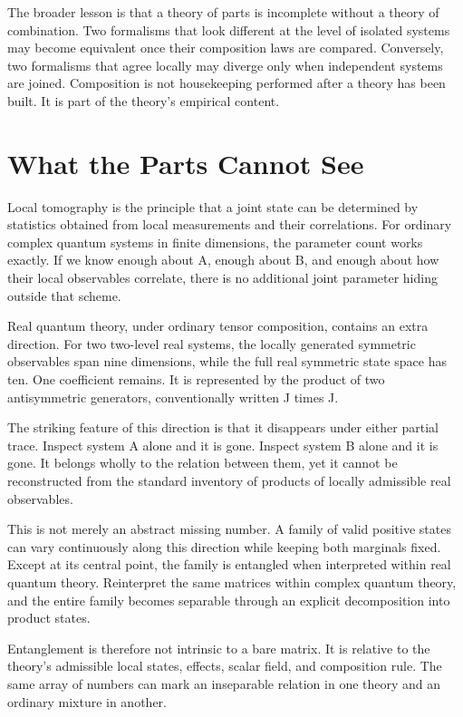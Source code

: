 \documentclass[12pt,openany]{book}
\begin{document}
The broader lesson is that a theory of parts is incomplete without a theory of combination. Two formalisms that look different at the level of isolated systems may become equivalent once their composition laws are compared. Conversely, two formalisms that agree locally may diverge only when independent systems are joined. Composition is not housekeeping performed after a theory has been built. It is part of the theory's empirical content.

\chapter{What the Parts Cannot See}
Local tomography is the principle that a joint state can be determined by statistics obtained from local measurements and their correlations. For ordinary complex quantum systems in finite dimensions, the parameter count works exactly. If we know enough about A, enough about B, and enough about how their local observables correlate, there is no additional joint parameter hiding outside that scheme.

Real quantum theory, under ordinary tensor composition, contains an extra direction. For two two-level real systems, the locally generated symmetric observables span nine dimensions, while the full real symmetric state space has ten. One coefficient remains. It is represented by the product of two antisymmetric generators, conventionally written J times J.

The striking feature of this direction is that it disappears under either partial trace. Inspect system A alone and it is gone. Inspect system B alone and it is gone. It belongs wholly to the relation between them, yet it cannot be reconstructed from the standard inventory of products of locally admissible real observables.

This is not merely an abstract missing number. A family of valid positive states can vary continuously along this direction while keeping both marginals fixed. Except at its central point, the family is entangled when interpreted within real quantum theory. Reinterpret the same matrices within complex quantum theory, and the entire family becomes separable through an explicit decomposition into product states.

Entanglement is therefore not intrinsic to a bare matrix. It is relative to the theory's admissible local states, effects, scalar field, and composition rule. The same array of numbers can mark an inseparable relation in one theory and an ordinary mixture in another.
\end{document}
